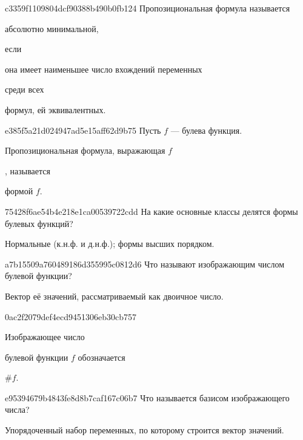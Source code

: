\begin{note}{c3359f1109804dcf90388b490b0fb124}
    Пропозициональная формула называется \begin{icloze}{3}абсолютно минимальной,\end{icloze} если \begin{icloze}{2}она имеет наименьшее число вхождений переменных\end{icloze} среди всех \begin{icloze}{1}формул, ей эквивалентных.\end{icloze}
\end{note}

\begin{note}{e385f5a21d024947ad5e15aff62d9b75}
    Пусть \({ f }\) --- булева функция.
    \begin{icloze}{2}Пропозициональная формула, выражающая \({ f }\)\end{icloze}, называется \begin{icloze}{1}формой \({ f }\).\end{icloze}
\end{note}

\begin{note}{75428f6ae54b4e218e1ca00539722cdd}
    На какие основные классы делятся формы булевых функций?

    \begin{cloze}{1}
        Нормальные (к.н.ф. и д.н.ф.); формы высших порядком.
    \end{cloze}
\end{note}

\begin{note}{a7b15509a760489186d355995c0812d6}
    Что называют изображающим числом булевой функции?

    \begin{cloze}{1}
        Вектор её значений, рассматриваемый как двоичное число.
    \end{cloze}
\end{note}

\begin{note}{0ac2f2079def4ecd9451306eb30cb757}
    \begin{icloze}{2}Изображающее число\end{icloze} булевой функции \({ f }\) обозначается \begin{icloze}{1}\({ \# f }\).\end{icloze}
\end{note}

\begin{note}{e95394679b4843fe8d8b7caf167c06b7}
    Что называется базисом изображающего числа?

    \begin{cloze}{1}
        Упорядоченный набор переменных, по которому строится вектор значений.
    \end{cloze}
\end{note}

